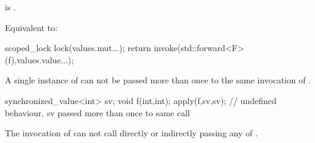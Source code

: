 \begin{itemdescr}
    

\pnum
\constraints
{} is .

\pnum
\effects
Equivalent to:

\begin{codeblock}
    scoped_lock lock(values.mut...);
    return invoke(std::forward<F>(f),values.value...);
\end{codeblock}

\begin{note} A single instance of  can not be
passed more than once to the same invocation of .
\begin{example}

\begin{codeblock}
      synchronized_value<int> sv;
      void f(int,int);
      apply(f,sv,sv); // undefined behaviour, sv passed more than once to same call
\end{codeblock}
\end{example}
 \end{note}

\begin{note} The invocation of  can not call 
directly or indirectly passing any of . 
\end{note}
\end{itemdescr}

